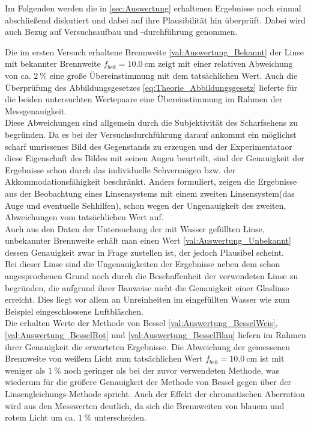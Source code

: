 
Im Folgenden werden die in \cref{sec:Auswertung} erhaltenen Ergebnisse 
noch einmal abschließend diskutiert und dabei auf ihre Plausibilität
hin überprüft. Dabei wird auch Bezug auf Versuchsaufbau und -durchführung 
genommen. 

Die im ersten Versuch erhaltene Brennweite \cref{val:Auswertung_Bekannt} der Linse
mit bekannter Brennweite  $f_{bek} = \SI{10.0}{\cm}$ zeigt mit einer relativen Abweichung 
von ca. $\SI{2}{\percent}$ eine große Übereinstimmung mit 
dem tatsächlichen Wert. Auch die Überprüfung des Abbildungsgesetzes \cref{eq:Theorie_Abbildungsgesetz} lieferte
für die beiden untersuchten Wertepaare eine Übereinstimmung im Rahmen der Messgenauigkeit. \\
Diese Abweichungen sind allgemein durch die Subjektivität des 
Scharfsehens zu begründen. Da es bei der Versuchsdurchführung darauf ankommt ein möglichst
scharf umrissenes Bild des Gegenstands zu erzeugen und der Experimentataor diese Eigenschaft 
des Bildes mit seinen Augen beurteilt, sind der Genauigkeit der Ergebnisse schon durch 
das individuelle Sehvermögen bzw. der Akkommodationsfähigkeit beschränkt. Anders formuliert, 
zeigen die Ergebnisse aus der Beobachtung eines Linsensystems mit einem zweiten Linsensystem(das Auge und eventuelle Sehhilfen), 
schon wegen der Ungenauigkeit des zweiten, 
Abweichungen vom tatsächlichen Wert auf. \\

Auch aus den Daten der Untersuchung der mit Wasser gefüllten Linse, unbekannter Brennweite
erhält man einen Wert \cref{val:Auswertung_Unbekannt} dessen Genauigkeit zwar in Frage zustellen ist,
der jedoch Plausibel scheint.\\
Bei dieser Linse sind die Ungenauigkeiten der Ergebnisse neben dem schon angesprochenen Grund
noch durch die Beschaffenheit der verwendeten Linse zu begründen, die aufgrund ihrer Bauweise 
nicht die Genauigkeit einer Glaslinse erreicht. Dies liegt vor allem an Unreinheiten im eingefüllten
Wasser wie zum Beispiel eingeschlossene Luftbläschen.\\

Die erhalten Werte der Methode von Bessel \cref{val:Auswertung_BesselWeis}, \cref{val:Auswertung_BesselRot} 
und \cref{val:Auswertung_BesselBlau} liefern im Rahmen ihrer Genauigkeit die erwarteten Ergebnisse.
Die Abweichung der gemessenen Brennweite von weißem Licht zum tatsächlichen Wert $f_{bek} = \SI{10.0}{\cm}$ 
ist mit weniger als $\SI{1}{\percent}$ noch geringer als bei der zuvor verwendeten Methode,
was wiederum für die größere Genauigkeit der Methode von Bessel gegen über der Linsengleichungs-Methode
spricht. Auch der Effekt der chromatischen Aberration wird aus den Messwerten deutlich, da sich
die Brennweiten von blauem und rotem Licht um ca. $\SI{1}{\percent}$ unterscheiden.

